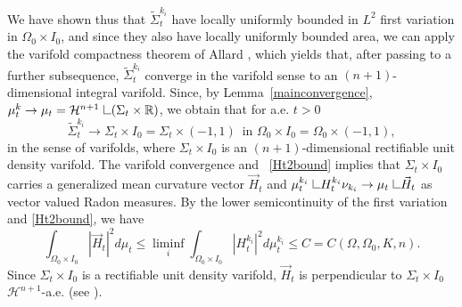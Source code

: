 \documentclass[11pt]{amsart}
\def\R{\mathbb{R}}
\def\H{\mathcal{H}}
\def\wt{\widetilde}
\def\res{\hbox{ {\vrule height .25cm}{\leaders\hrule\hskip.2cm}}\hskip5.0\mu}
\begin{document}
We have shown thus that $\wt\Sigma_t^{k_i}$
have locally uniformly  bounded in $L^2$ first variation in $\Omega_0\times I_0$, and since they also have locally uniformly bounded area,
we can apply the varifold compactness theorem of Allard \cite{Al}, which yields that,  after passing to a further subsequence, $\wt\Sigma_t^{k_i}$  converge in the varifold sense to an $(n+1)$-dimensional integral varifold. Since, by Lemma~\ref{mainconvergence}, $\mu_t^k\to \mu_t=\H^{n+1}\res(\Sigma_t\times\R)$,  we obtain that for a.e. $t>0$
\begin{equation}\label{varconv}
\wt\Sigma^{k_i}_t\to \Sigma_t\times I_0=\Sigma_t\times (-1,1)\,\,\,\text{in   }\Omega_0\times I_0=\Omega_0\times(-1,1),
\end{equation}
in the sense of varifolds, where $\Sigma_t\times I_0$ is an $(n+1)$-dimensional rectifiable unit density varifold.
The varifold convergence and ~\eqref{Ht2bound} implies that $\Sigma_t\times I_0$ carries a generalized mean curvature vector $\vec H_t$ and $\mu^{k_i}_t\res H_t^{k_i}\nu_{k_i}\to\mu_t\res \vec H_t$ as vector valued Radon measures.  By the lower semicontinuity of the first variation and \eqref{Ht2bound}, we have
\begin{equation}\label{Hlimit}
\int_{\Omega_0\times I_0}|\vec H_t|^2d\mu_t\le \liminf_i\int_{\Omega_0\times I_0}|H^{k_i}_t|^2d\mu^{k_i}_t\le C=C(\Omega, \Omega_0,K,n).
\end{equation}
Since $\Sigma_t\times I_0$ is a rectifiable unit density varifold, $\vec H_t$ is perpendicular to $\Sigma_t\times I_0$ $\H^{n+1}$-a.e. (see \cite[Chapter 5]{B}).
\end{document}
